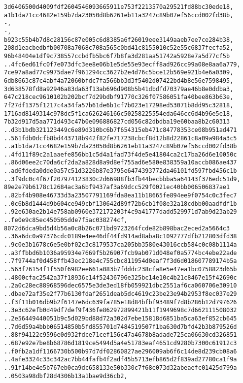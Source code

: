\documentclass[
]{article}
\begin{document}
\begin{verbatim}
3d6406500d4009fdf2604546093665911e753f2213570a29521fd88bc30ede18,
a1b1da71cc4682e159b7da23050d8b6261eb11a3247c89b07ef56ccd002fd38b,
-,
-,
b923c55b4b7d8c28156c87e005c6d8385a6f26019eee3149aaeb7ee7ce284b38,
208d1eacbedbfb00708a7068c708a565c0bd41c8155010c52e55c6837fecfa52,
96b48404e1df9c738557ccbdfb5bc6f7b8fa3d281aa51742a5928e7a5d77cf5b
..4fc6ed61fc0f7e073dfc3ee8e06b1e5de55e93ecff8ad926cc99a08e8aa6a779,
7ce97a8ad77c9975dae7f961294cc3627b2e4d76c5bce12b569e921b4e6a0309,
6db8663c87c4abf4a72060bfdc7fa566bb3d3f5402d07422bd4b8e56e7598495,
3d638578fd8a92946a83da63f13ab696d908b5b41dbdfd70379ae46b8e0ddba3,
647c218cec9610102b202bcf7d29bdbf91770c326f07586051fa40bee863b63e,
7f27df1375f1217c4a34fa57b61de6b1cf7b023e17298ed53071b8dd95c32818,
1716ad8149314c978dc5f1ca626246166c50258225554eda646cc6d4b96e5e18,
7b32d917d5aa771d493c47b0e096886827cd056c82dbdba19e60baa8b2c60313
..d3b1bdb321123449c6e89d310bc6b7f654315eb471c84778353ce08b951ad471
..561fdb0dcfb8bd443718b942f82fe717238cbcf8d12b8d22861c8a09a984a3c5
..a1b1da71cc4682e159b7da23050d8b6261eb11a3247c89b07ef56ccd002fd38b
..4fd11f89c2a1aaefe856bb1c5d4a1fad73f4de5e41804ca2c17ba26d6e10050c
..86d06ee2c70da6cf2da2a828d8a9d8ef755ad6e580e838359a10accb086ae437
..ad6fdeda0dde0a57c51d3226b87e3795e6474393772da46101fd597fbd456c1b
..3f9dc0c4f67f207974123830c2d66988fb3fb44becbbba5a64143f376edc51d9,
89e2e79b6178c12684ac3a6bf9437af3a69dcc529f0021ec40bb006506837ae1
..82bf4b908e46733d3a23507791169fda8ea11b18665fe894ee9f0754c0c3fec7
..0c6b8d1444d9b604ce949cbf130642d89f72b6cb1f08e32a18cdbb00aadfdf1b
..92e630ae2b14e758ab0960e372172203f4c9a41777dadd529971d7ab9d23ab29
..fe0e9c85ec450505dde7f5ac038274cf,
8072d6dca9bd5d4b56a0c8b26c071bd9723264fcde82b898bac2eced2a5664c3
..36a6dc0a97376cdc0189e4ee46df44fd914ad8aba8c1092777dfb212803dfd38
..9c0e3b1678c6e5e0bf02c3c8179537ca205bb3580e43016ccb584c0c08b1114a
..a3ffbbd6b1036a95934e7669f5b26907fcb9ab071d048ef0a5774bc4ebe22ade
..7f9744af0d458ffb43ec218e4c755cbc811954d0eaf7f3d6d018607789174b5a
..563f76154f1f550f6982ee661a083b7fdddc238cfa8e5e47ea1bc0758823d65b
..4800cfac2542a37f18936c14f52436796e325bc14e10c4b21c8467e15f42690c
..2a0c28ec88968596dec6575e3de3ed18fb059921dbc2551af6ca060706e30910
..dbae72af35e2f77b6130fdaf2651deab5dc4619c23be23e94b2953f8ec037e29
..f3f11b016db9b2f6147e6dc639fa785e18d84bfbf93489f7d8b286b12d797626
..3e3c62efb0d49df7def9f436fe862972899421b11f1949698c7d662111508032
..2e56449440051b9c5d029bd88d72a302d7ebe15818d6851ba5ca63ef852cb645
..7d6d59a4bbb06514850b5fd855701d7484519507f1ba630d7bfd42b3b879526d
..88f94122c9596e0d932fdce71cef156c47a4678b8adade725ca06630cd326851
..687e92e7be8b68786d1819ce5494d5a4e51783eaf4651cd9280b7300c61912c3
..f0fb2a1df1166730b500b97d7df02860827ae296009ab6f6c14de8d239cb08a6
..4afe3324c33c342ac7bb44fafb4f2adf45b5713efb865d2f839ad27780ca1f9a
..91f14be4e5b767eb0ca9dc658133e50b330c7f68e073d32abeaefc01425d799a
..0503a98dbf28d4306b13a1bae9d36cb2,
\end{verbatim}
\end{document}
